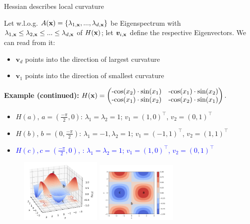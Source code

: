 \begin{vbframe}{Hessian describes local curvature} 

Let w.l.o.g. $A(\mathbf{x}) = \{\lambda_{1, \mathbf{x}}, ..., \lambda_{d, \mathbf{x}}\}$ be Eigenspectrum with $\lambda_{1, \mathbf{x}} \le \lambda_{2, \mathbf{x}} \le ... \le \lambda_{d, \mathbf{x}}$ of $H(\mathbf{x})$; let $\bm{v}_{i, \mathbf{x}}$ define the respective Eigenvectors. We can read from it: 

\begin{itemize}
  \item $\bm{v}_d$ points into the direction of largest curvature 
  \item $\bm{v}_1$ points into the direction of smallest curvature 
\end{itemize}

\vspace*{0.2cm}

\begin{footnotesize}

\textbf{Example (continued):} $H(\mathbf{x}) = \begin{pmatrix}
\text{-cos}(x_2)\cdot\text{sin}(x_1) & \text{-cos}(x_1)\cdot\text{sin}(x_2) 
\\ \text{-cos}(x_1)\cdot\text{sin}(x_2) & \text{-cos}(x_2)\cdot\text{sin}(x_1) 
\end{pmatrix}.
$

\begin{itemize}
  \item $H(a)$, $a=(\frac{-\pi}{2},0)$: $\lambda_1 = \lambda_2 = 1$; $v_1 = (1, 0)^\top$, $v_2 = (0, 1)^\top$
  \item $H(b)$, $b=(0,\frac{-\pi}{2})$: $\lambda_1 = -1, \lambda_2 = 1$; $v_1 = (-1, 1)^\top$, $v_2 = (1, 1)^\top$
  \item \textcolor{blue}{$H(c), c=(\frac{-\pi}{2},0)$, : $\lambda_1 = \lambda_2 = 1$; $v_1 = (1, 0)^\top$, $v_2 = (0, 1)^\top$}
\end{itemize}

\end{footnotesize}

\vspace*{-0.5cm}

\begin{figure}[!tbp]
    \includegraphics[width=0.35\textwidth]{figure_man/hessian_3d.png}
    \includegraphics[width=0.35\textwidth]{figure_man/hessian_contour.png}
\end{figure} 

\end{vbframe}


